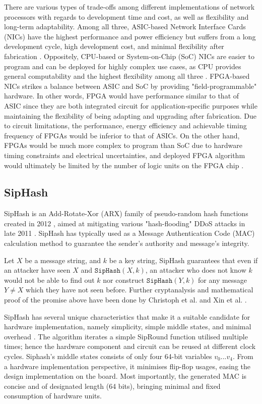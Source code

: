 \documentclass[a4paper]{report}
\newcommand{\code}{\texttt}
\begin{document}
There are various types of trade-offs among different implementations of network processors with regards to development time and cost, as well as flexibility and long-term adaptability. Among all three, ASIC-based Network Interface Cards (NICs) have the highest performance and power efficiency but suffers from a long development cycle, high development cost, and minimal flexibility after fabrication \cite{amara-2006, deierling-2018}. Oppositely, CPU-based or System-on-Chip (SoC) NICs are easier to program and can be deployed for highly complex use cases, as CPU provides general computability and the highest flexibility among all three \cite{deierling-2018}. FPGA-based NICs strikes a balance between ASIC and SoC by providing "field-programmable" hardware. In other words, FPGA would have performance similar to that of ASIC since they are both integrated circuit for application-specific purposes while maintaining the flexibility of being adapting and upgrading after fabrication. Due to circuit limitations, the performance, energy efficiency and achievable timing frequency of FPGAs would be inferior to that of ASICs. On the other hand, FPGAs would be much more complex to program than SoC due to hardware timing constraints and electrical uncertainties, and deployed FPGA algorithm would ultimately be limited by the number of logic units on the FPGA chip \cite{deierling-2018}.

\subsection{SipHash}

SipHash is an Add-Rotate-Xor (ARX) family of pseudo-random hash functions created in 2012 \cite{aumasson-bernstein-2012}, aimed at mitigating various "hash-flooding" DDoS attacks in late 2011 \cite{lennon-2011}. SipHash has typically used as a Message Authentication Code (MAC) calculation method to guarantee the sender's authority and message's integrity. 

Let $X$ be a message string, and $k$ be a key string, SipHash guarantees that even if an attacker have seen $X$ and $\code{SipHash}(X, k)$, an attacker who does not know $k$ would not be able to find out $k$ nor construct $\code{SipHash}(Y, k)$ for any message $Y \neq X$ which they have not seen before. Further cryptanalysis and mathematical proof of the promise above have been done by Christoph et al. \cite{dobraunig-2014} and Xin et al. \cite{xin-2019}.

SipHash has several unique characteristics that make it a suitable candidate for hardware implementation, namely simplicity, simple middle states, and minimal overhead \cite{aumasson-bernstein-2012}. The algorithm iterates a simple SipRound function utilised multiple times; hence the hardware component and circuit can be reused at different clock cycles. Siphash's middle states consists of only four 64-bit variables $v_0 ... v_4$. From a hardware implementation perspective, it minimises flip-flop usages, easing the design implementation on the board. Most importantly, the generated MAC is concise and of designated length (64 bits), bringing minimal and fixed consumption of hardware units.
\end{document}
